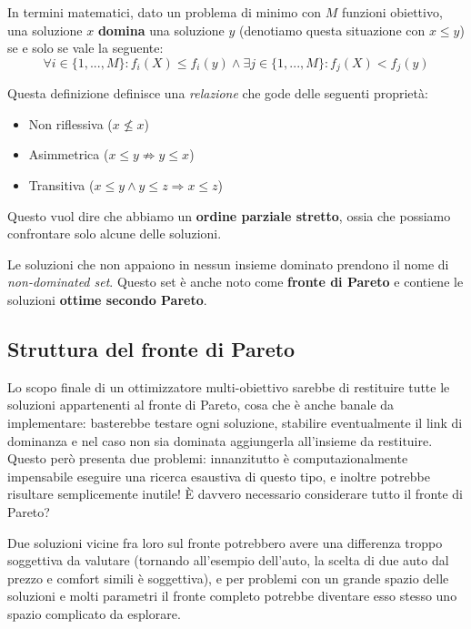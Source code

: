         In termini matematici, dato un problema di minimo con $M$ funzioni obiettivo, una soluzione $x$ \textbf{domina} una soluzione $y$ (denotiamo questa situazione con $x \leq y$) se e solo se vale la seguente:
        \begin{equation*}
            \forall i \in \{1, ..., M\} \colon f_i(X) \leq f_i(y) \land \exists j \in \{1, ..., M\} \colon f_j(X) < f_j(y)
        \end{equation*}
        
        Questa definizione definisce una \textit{relazione} che gode delle seguenti proprietà:
        \begin{itemize}
            \item Non riflessiva ($x \not\leq x$)
            \item Asimmetrica ($x \leq y \not\Rightarrow y \leq x$)
            \item Transitiva ($x \leq y \land y \leq z \Rightarrow x \leq z$)
        \end{itemize}
        
        Questo vuol dire che abbiamo un \textbf{ordine parziale stretto}, ossia che possiamo confrontare solo alcune delle soluzioni.
        
        Le soluzioni che non appaiono in nessun insieme dominato prendono il nome di \textit{non-dominated set}. Questo set è anche noto come \textbf{fronte di Pareto} e contiene le soluzioni \textbf{ottime secondo Pareto}.
        
    \subsection{Struttura del fronte di Pareto}
        Lo scopo finale di un ottimizzatore multi-obiettivo sarebbe di restituire tutte le soluzioni appartenenti al fronte di Pareto, cosa che è anche banale da implementare: basterebbe testare ogni soluzione, stabilire eventualmente il link di dominanza e nel caso non sia dominata aggiungerla all'insieme da restituire. Questo però presenta due problemi: innanzitutto è computazionalmente impensabile eseguire una ricerca esaustiva di questo tipo, e inoltre potrebbe risultare semplicemente inutile! È davvero necessario considerare tutto il fronte di Pareto?
        
        Due soluzioni vicine fra loro sul fronte potrebbero avere una differenza troppo soggettiva da valutare (tornando all'esempio dell'auto, la scelta di due auto dal prezzo e comfort simili è soggettiva), e per problemi con un grande spazio delle soluzioni e molti parametri il fronte completo potrebbe diventare esso stesso uno spazio complicato da esplorare.
        
